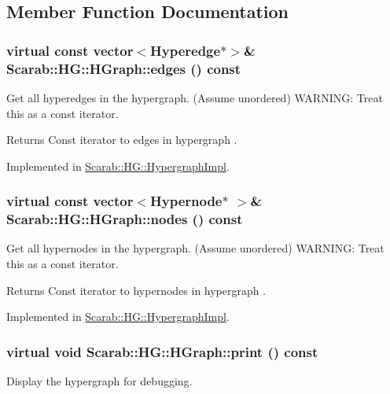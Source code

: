 \subsection{Member Function Documentation}
\hypertarget{classScarab_1_1HG_1_1HGraph_a57328729f90cc4152ca79ff15ecdd4bb}{
\subsubsection[{edges}]{\setlength{\rightskip}{0pt plus 5cm}virtual const vector$<${\bf Hyperedge}$\ast$$>$\& Scarab::HG::HGraph::edges () const}}
\label{classScarab_1_1HG_1_1HGraph_a57328729f90cc4152ca79ff15ecdd4bb}
Get all hyperedges in the hypergraph. (Assume unordered) WARNING: Treat this as a const iterator. \begin{DoxyReturn}{Returns}
Const iterator to edges in hypergraph . 
\end{DoxyReturn}


Implemented in \hyperlink{classScarab_1_1HG_1_1HypergraphImpl_a0c8373e545fe59b0cb7036b4751508e1}{Scarab::HG::HypergraphImpl}.

\hypertarget{classScarab_1_1HG_1_1HGraph_a74d893fba015520774f71f02a46bb6ca}{
\subsubsection[{nodes}]{\setlength{\rightskip}{0pt plus 5cm}virtual const vector$<${\bf Hypernode}$\ast$ $>$\& Scarab::HG::HGraph::nodes () const}}
\label{classScarab_1_1HG_1_1HGraph_a74d893fba015520774f71f02a46bb6ca}
Get all hypernodes in the hypergraph. (Assume unordered) WARNING: Treat this as a const iterator. \begin{DoxyReturn}{Returns}
Const iterator to hypernodes in hypergraph . 
\end{DoxyReturn}


Implemented in \hyperlink{classScarab_1_1HG_1_1HypergraphImpl_a9aef2881b489c86d4d83e996a70f8141}{Scarab::HG::HypergraphImpl}.

\hypertarget{classScarab_1_1HG_1_1HGraph_ab5aa11c932b28864b56f28e0babbc1c1}{
\subsubsection[{print}]{\setlength{\rightskip}{0pt plus 5cm}virtual void Scarab::HG::HGraph::print () const}}
\label{classScarab_1_1HG_1_1HGraph_ab5aa11c932b28864b56f28e0babbc1c1}
Display the hypergraph for debugging. 

